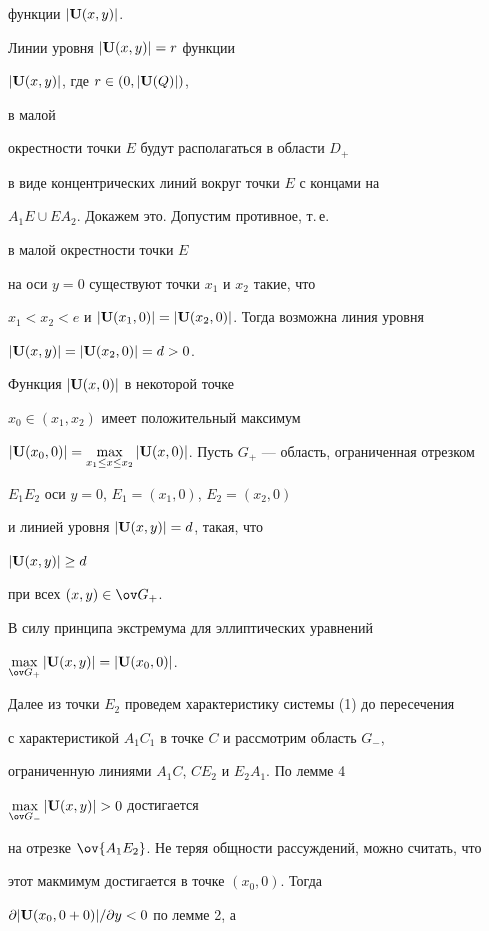 функции $|{\bold U}(x,y)|$.


Линии уровня $|{\bold U}(x,y)|=r$ функции


$|{\bold U}(x,y)|$, где $r\in(0,|{\bold U}(Q)|)$,


в малой


окрестности точки $E$ будут располагаться в области $D_+$


в виде концентрических линий вокруг точки $E$ с концами на


$A_1E\cup EA_2$. Докажем это. Допустим противное, т.\,е.


в малой окрестности точки $E$


на оси $y=0$ существуют точки $x_1$ и $x_2$ такие, что


$x_1<x_2<e$ и $|{\bold


U}(x_1,0)|=|{\bold U}(x_2,0)|$. Тогда возможна линия уровня


$|{\bold U}(x,y)|=|{\bold U}(x_2,0)|=d>0$.


Функция $|{\bold U}(x,0)|$ в некоторой точке


$x_0\in(x_1,x_2)$ имеет положительный максимум


$|{\bold U}(x_0,0)|=\max\limits_{x_1\le x\le x_2}


|{\bold U}(x,0)|$. Пусть $G_+$ --- область, ограниченная отрезком


$E_1E_2$ оси $y=0$, $E_1=(x_1,0)$, $E_2=(x_2,0)$


и линией уровня $|\bold U(x,y)|=d$, такая, что


$|\bold U(x,y)|\ge d$


при всех $(x,y)\in\ov G_+$.


В силу принципа экстремума для эллиптических уравнений


$\max\limits_{\ov G_+}|\bold U(x,y)|=|\bold U(x_0,0)|$.


Далее из точки $E_2$ проведем характеристику системы (1) до пересечения


с характеристикой $A_1C_1$ в точке $C$ и рассмотрим область $G_-$,


ограниченную линиями $A_1C$, $C E_2$ и $E_2A_1$. По лемме 4\;


$\max\limits_{\ov G_-}|\bold U(x,y)|>0$ достигается


на отрезке $\ov{A_1E_2}$. Не теряя общности рассуждений, можно считать, что


этот макмимум достигается в точке $(x_0,0)$. Тогда


$\partial|\bold U(x_0,0+0)|/\partial y<0$ по лемме 2, а


